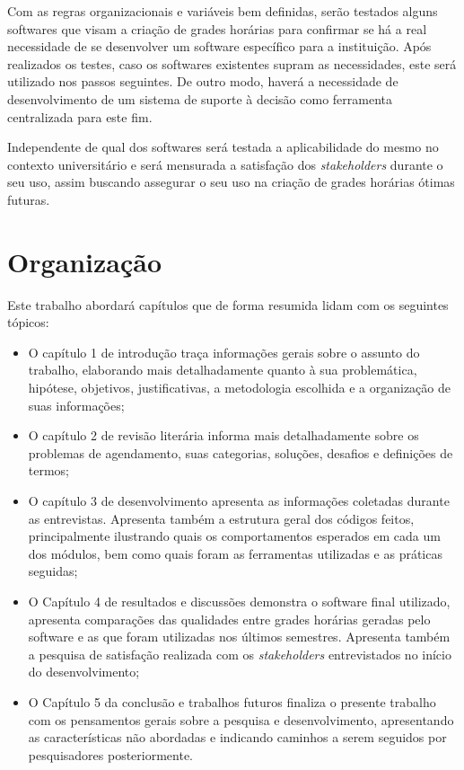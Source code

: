 
    Com as regras organizacionais e variáveis bem definidas, serão testados alguns softwares que visam a criação de grades horárias para confirmar se há a real necessidade de se desenvolver um software específico para a instituição. Após realizados os testes, caso os softwares existentes supram as necessidades, este será utilizado nos passos seguintes. De outro modo, haverá a necessidade de desenvolvimento de um sistema de suporte à decisão como ferramenta centralizada para este fim.

    Independente de qual dos softwares será testada a aplicabilidade do mesmo no contexto universitário e será mensurada a satisfação dos \textit{stakeholders} durante o seu uso, assim buscando assegurar o seu uso na criação de grades horárias ótimas futuras.

\section{Organização} %

    Este trabalho abordará capítulos que de forma resumida lidam com os seguintes tópicos:

    \begin{itemize}
        \item O capítulo 1 de introdução traça informações gerais sobre o assunto do trabalho, elaborando mais detalhadamente quanto à sua problemática, hipótese, objetivos, justificativas, a metodologia escolhida e a organização de suas informações;
        \item O capítulo 2 de revisão literária informa mais detalhadamente sobre os problemas de agendamento, suas categorias, soluções, desafios e definições de termos;
        \item O capítulo 3 de desenvolvimento apresenta as informações coletadas durante as entrevistas. Apresenta também a estrutura geral dos códigos feitos, principalmente ilustrando quais os comportamentos esperados em cada um dos módulos, bem como quais foram as ferramentas utilizadas e as práticas seguidas;
        \item O Capítulo 4 de resultados e discussões demonstra o software final utilizado, apresenta comparações das qualidades entre grades horárias geradas pelo software e as que foram utilizadas nos últimos semestres. Apresenta também a pesquisa de satisfação realizada com os \textit{stakeholders} entrevistados no início do desenvolvimento;
        \item O Capítulo 5 da conclusão e trabalhos futuros finaliza o presente trabalho com os pensamentos gerais sobre a pesquisa e desenvolvimento, apresentando as características não abordadas e indicando caminhos a serem seguidos por pesquisadores posteriormente.
    \end{itemize}

